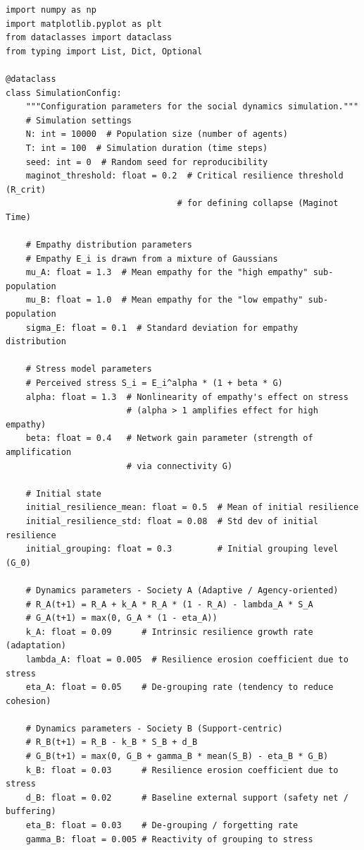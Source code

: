 \documentclass[11pt]{article}
\theoremstyle{plain}
\begin{document}
\begin{verbatim}
import numpy as np
import matplotlib.pyplot as plt
from dataclasses import dataclass
from typing import List, Dict, Optional

@dataclass
class SimulationConfig:
    """Configuration parameters for the social dynamics simulation."""
    # Simulation settings
    N: int = 10000  # Population size (number of agents)
    T: int = 100  # Simulation duration (time steps)
    seed: int = 0  # Random seed for reproducibility
    maginot_threshold: float = 0.2  # Critical resilience threshold (R_crit)
                                  # for defining collapse (Maginot Time)

    # Empathy distribution parameters
    # Empathy E_i is drawn from a mixture of Gaussians
    mu_A: float = 1.3  # Mean empathy for the "high empathy" sub-population
    mu_B: float = 1.0  # Mean empathy for the "low empathy" sub-population
    sigma_E: float = 0.1  # Standard deviation for empathy distribution

    # Stress model parameters
    # Perceived stress S_i = E_i^alpha * (1 + beta * G)
    alpha: float = 1.3  # Nonlinearity of empathy's effect on stress
                        # (alpha > 1 amplifies effect for high empathy)
    beta: float = 0.4   # Network gain parameter (strength of amplification
                        # via connectivity G)

    # Initial state
    initial_resilience_mean: float = 0.5  # Mean of initial resilience
    initial_resilience_std: float = 0.08  # Std dev of initial resilience
    initial_grouping: float = 0.3         # Initial grouping level (G_0)

    # Dynamics parameters - Society A (Adaptive / Agency-oriented)
    # R_A(t+1) = R_A + k_A * R_A * (1 - R_A) - lambda_A * S_A
    # G_A(t+1) = max(0, G_A * (1 - eta_A))
    k_A: float = 0.09      # Intrinsic resilience growth rate (adaptation)
    lambda_A: float = 0.005  # Resilience erosion coefficient due to stress
    eta_A: float = 0.05    # De-grouping rate (tendency to reduce cohesion)

    # Dynamics parameters - Society B (Support-centric)
    # R_B(t+1) = R_B - k_B * S_B + d_B
    # G_B(t+1) = max(0, G_B + gamma_B * mean(S_B) - eta_B * G_B)
    k_B: float = 0.03      # Resilience erosion coefficient due to stress
    d_B: float = 0.02      # Baseline external support (safety net / buffering)
    eta_B: float = 0.03    # De-grouping / forgetting rate
    gamma_B: float = 0.005 # Reactivity of grouping to stress


\end{verbatim}
\end{document}
